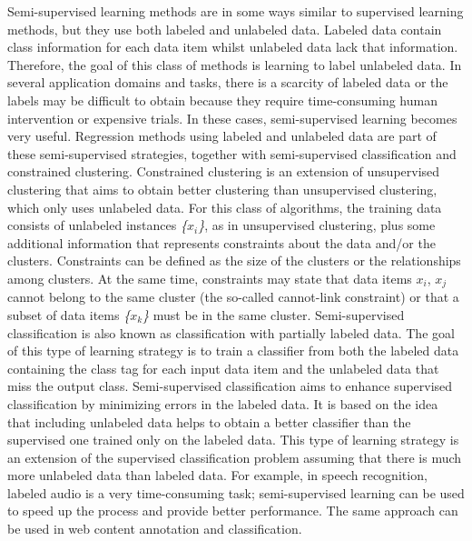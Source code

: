 Semi-supervised learning methods are in some ways similar to supervised learning methods, but they use both labeled and unlabeled data. Labeled data contain class information for each data item whilst unlabeled data lack that information. Therefore, the goal of this class of methods is learning to label unlabeled data. In several application domains and tasks, there is a scarcity of labeled data or the labels may be difficult to obtain because they require time-consuming human intervention or expensive trials. In these cases, semi-supervised learning becomes very useful. Regression methods using labeled and unlabeled data are part of these semi-supervised strategies, together with semi-supervised classification and constrained clustering. Constrained clustering is an extension of unsupervised clustering that aims to obtain better clustering than unsupervised clustering, which only uses unlabeled data. For this class of algorithms, the training data consists of unlabeled instances \textit{\{}$x{}_{i}$\textit{\}}, as in unsupervised clustering, plus some additional information that represents constraints about the data and/or the clusters. Constraints can be defined as the size of the clusters or the relationships among clusters. At the same time, constraints may state that data items $x{}_{i}$, $x{}_{j}$ cannot belong to the same cluster (the so-called cannot-link constraint) or that a subset of data items \textit{\{}$x{}_{k}$\textit{\}} must be in the same cluster. Semi-supervised classification is also known as classification with partially labeled data. The goal of this type of learning strategy is to train a classifier from both the labeled data containing the class tag for each input data item and the unlabeled data that miss the output class. Semi-supervised classification aims to enhance supervised classification by minimizing errors in the labeled data. It is based on the idea that including unlabeled data helps to obtain a better classifier than the supervised one trained only on the labeled data. This type of learning strategy is an extension of the supervised classification problem assuming that there is much more unlabeled data than labeled data. For example, in speech recognition, labeled audio is a very time-consuming task; semi-supervised learning can be used to speed up the process and provide better performance. The same approach can be used in web content annotation and classification.

